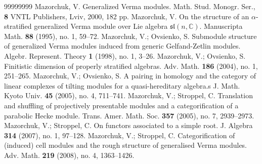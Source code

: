 \documentclass[a4paper]{amsart}
\begin{document}
\begin{thebibliography}{99999999}
Mazorchuk, V.
Generalized Verma modules.
Math. Stud. Monogr. Ser., {\bf  8}
VNTL Publishers, Lviv, 2000, 182 pp.
% 
% 
% 
% 
% 
% 
Mazorchuk, V. 
On the structure of an $\alpha$-stratified generalized Verma module 
over Lie algebra $\mathfrak{sl}(n,\mathbb{C})$. 
Manuscripta Math. {\bf 88} (1995), no. 1, 59--72.
Mazorchuk, V.; Ovsienko, S.
Submodule structure of generalized Verma modules induced 
from generic Gelfand-Zetlin modules.
Algebr. Represent. Theory {\bf 1} (1998), no. 1, 3--26.
Mazorchuk, V.; Ovsienko, S.
Finitistic dimension of properly stratified algebras.
Adv. Math. {\bf 186} (2004), no. 1, 251--265.
Mazorchuk, V.; Ovsienko, S.
A pairing in homology and the category of linear complexes 
of tilting modules for a quasi-hereditary algebra.s
J. Math. Kyoto Univ. {\bf 45} (2005), no. 4, 711--741.
Mazorchuk, V.; Stroppel, C. 
Translation and shuffling of projectively presentable 
modules and a categorification of a parabolic Hecke module.
Trans. Amer. Math. Soc. {\bf 357} (2005), no. 7, 2939--2973.
 Mazorchuk, V.; Stroppel, C. 
On functors associated to a simple root.
J. Algebra {\bf 314} (2007), no. 1, 97--128.
 Mazorchuk, V.; Stroppel, C. 
Categorification of (induced) cell modules and 
the rough structure of generalised Verma modules. 
Adv. Math. {\bf 219} (2008), no. 4, 1363--1426. 

\end{thebibliography}
\end{document}

